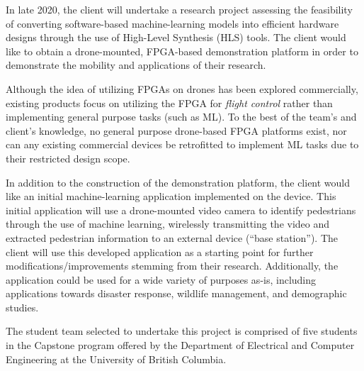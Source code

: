 In late 2020, the client will undertake a research project assessing the feasibility of converting software-based machine-learning models into efficient hardware designs through the use of High-Level Synthesis (HLS) tools. The client would like to obtain a drone-mounted, FPGA-based demonstration platform in order to demonstrate the mobility and applications of their research. 

Although the idea of utilizing FPGAs on drones has been explored commercially\cite{existing-prod}, existing products focus on utilizing the FPGA for \textit{flight control} rather than implementing general purpose tasks (such as ML). To the best of the team's and client's knowledge, no general purpose drone-based FPGA platforms exist, nor can any existing commercial devices be retrofitted to implement ML tasks due to their restricted design scope.

In addition to the construction of the demonstration platform, the client would like an initial machine-learning application implemented on the device. This initial application will use a drone-mounted video camera to identify pedestrians through the use of machine learning, wirelessly transmitting the video and extracted pedestrian information to an external device (``base station''). The client will use this developed application as a starting point for further modifications/improvements stemming from their research. Additionally, the application could be used for a wide variety of purposes as-is, including applications towards disaster response, wildlife management, and demographic studies.

The student team selected to undertake this project is comprised of five students in the Capstone program offered by the Department of Electrical and Computer Engineering at the University of British Columbia.
